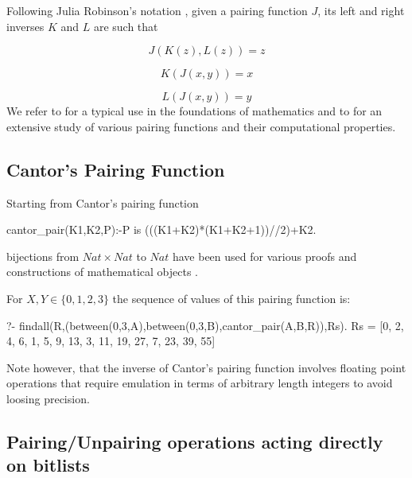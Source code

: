 \documentclass[]{INCLUDES/llncs}
\begin{document}
Following Julia Robinson's notation \cite{robinson50}, 
given a pairing function $J$, its left and right inverses $K$ and $L$ 
are such that

\begin{equation}
J(K(z),L(z))=z
\end{equation}

\begin{equation}
K(J(x,y))=x
\end{equation}

\begin{equation} 
L(J(x,y))=y 
\end{equation}
We refer to  \cite{DBLP:journals/tcs/CegielskiR01} for a typical use 
in the foundations of mathematics and to \cite{DBLP:conf/ipps/Rosenberg02a} 
for an extensive study of various pairing functions and their computational properties. 

\subsection{Cantor's Pairing Function}

Starting from Cantor's pairing function
\begin{code}
cantor_pair(K1,K2,P):-P is (((K1+K2)*(K1+K2+1))//2)+K2.
\end{code}
bijections from $Nat \times Nat$ to $Nat$ have been used for various proofs 
and constructions of mathematical objects 
\cite{robinson50,DBLP:journals/tcs/CegielskiR01}.

For $X,Y \in \{0,1,2,3\}$ the sequence of values of this pairing function is:
\begin{codex}
?- findall(R,(between(0,3,A),between(0,3,B),cantor_pair(A,B,R)),Rs).
Rs = [0, 2, 4, 6, 1, 5, 9, 13, 3, 11, 19, 27, 7, 23, 39, 55]
\end{codex}
\noindent Note however, that the inverse of Cantor's pairing function involves
floating point operations that require emulation in terms of arbitrary length
integers to avoid loosing precision. %
\begin{comment}
\begin{code}
cantor_unpair(Z,K1,K2):-
  I is floor((sqrt(8*Z+1)-1)/2),
  K1 is ((I*(3+I))//2)-Z,
  K2 is Z-((I*(I+1))//2).
\end{code}
\end{comment}
\subsection{Pairing/Unpairing 
operations acting directly on bitlists} \label{BitMerge}
\end{document}
